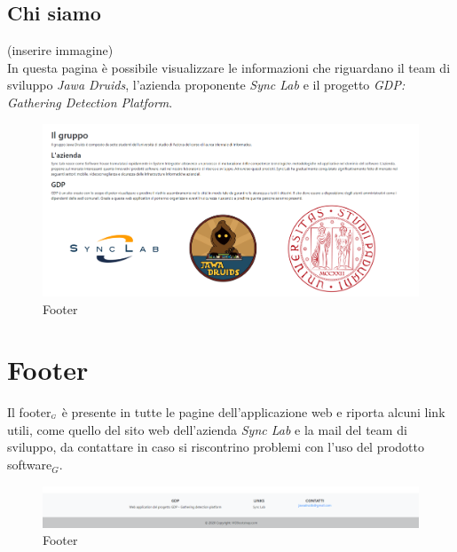 \subsection{Chi siamo} \label{UtilizzoDiGDPGatheringDetecionPlatformContenutoCentraleChiSiamo}
(inserire immagine)\\
In questa pagina è possibile visualizzare le informazioni che riguardano il team di sviluppo \textit{Jawa Druids}, l'azienda proponente \textit{Sync Lab} e il progetto \textit{GDP: Gathering Detection Platform}. 
\begin{center}
	\begin{figure}
		\includegraphics[width=0.5\linewidth]{../immagini/manualeUtente/AboutUs.png}
		\caption{Footer}
	\end{figure}
\end{center} 

\section{Footer}\label{UtilizzoDiGDPGatheringDetecionPlatformFooter}
Il footer$_{\scaleto{G}{3pt}}$ è presente in tutte le pagine dell'applicazione web e riporta alcuni link utili, come quello del sito web dell'azienda \textit{Sync Lab} e la mail del team di sviluppo, da contattare in caso si riscontrino problemi con l'uso del prodotto software$_G$. 
\begin{center}
	\begin{figure}
		\includegraphics[width=1\linewidth]{../immagini/manualeUtente/Footer.png}
		\caption{Footer}
	\end{figure}
\end{center}


